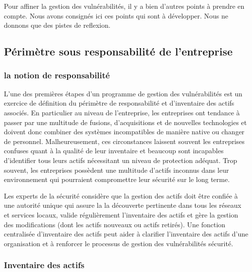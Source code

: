 

Pour affiner la gestion des vulnérabilités, il y a bien d'autres points à prendre en compte. Nous avons consignés ici ces points qui sont à développer. Nous ne donnons que des pistes de reflexion.
\subsection{Périmètre sous responsabilité de l’entreprise}

\subsubsection{la notion de responsabilité}

L'une des premières étapes d'un programme de gestion des vulnérabilités est un exercice de définition du périmètre de responsabilité et d'inventaire des actifs associés. En particulier au niveau de l'entreprise, les entreprises ont tendance à passer par une multitude de fusions, d'acquisitions et de nouvelles technologies et doivent donc combiner des systèmes incompatibles de manière native ou changer de personnel. Malheureusement, ces circonstances laissent souvent les entreprises confuses quant à la qualité de leur inventaire et beaucoup sont incapables d'identifier tous leurs actifs nécessitant un niveau de protection adéquat. Trop souvent, les entreprises possèdent une multitude d'actifs inconnus dans leur environnement qui pourraient compromettre leur sécurité sur le long terme.

Les experts de la sécurité considère que la gestion des actifs doit être confiée à une autorité unique qui assure la la découverte pertinente dans tous les réseaux et services locaux, valide régulièrement l’inventaire des actifs et gère la gestion des modifications (dont les actifs nouveaux ou actifs retirés). Une fonction centralisée d’inventaire des actifs peut aider à clarifier l’inventaire des actifs d’une organisation et à renforcer le processus de gestion des vulnérabilités sécurité.


\subsubsection{Inventaire des actifs}

